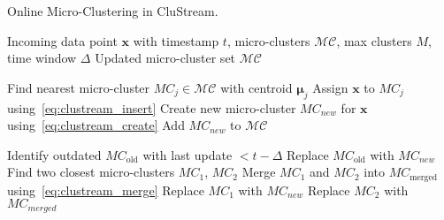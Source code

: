 \begin{algorithm}[H]
    \caption{Online Micro-Clustering in CluStream.}
    \label{alg:clustream_online}
    \begin{algorithmic}[1]
        \REQUIRE Incoming data point $\mathbf{x}$ with timestamp $t$, micro-clusters $\mathcal{MC}$, max clusters $M$, time window $\Delta$
        \ENSURE Updated micro-cluster set $\mathcal{MC}$

        \STATE Find nearest micro-cluster $MC_j \in \mathcal{MC}$ with centroid $\boldsymbol{\mu}_j$
        \STATE Assign $\mathbf{x}$ to $MC_j$ using~\ref{eq:clustream_insert}
        \ELSE
        \STATE Create new micro-cluster $MC_{new}$ for $\mathbf{x}$ using~\ref{eq:clustream_create}
        \STATE Add $MC_{new}$ to $\mathcal{MC}$
        
        \ELSE
        \STATE Identify outdated $MC_{\text{old}}$ with last update $< t - \Delta$
        \STATE Replace $MC_{\text{old}}$ with $MC_{new}$
        \ELSE
        \STATE Find two closest micro-clusters $MC_1$, $MC_2$
        \STATE Merge $MC_1$ and $MC_2$ into $MC_{\text{merged}}$ using~\ref{eq:clustream_merge}
        \STATE Replace $MC_1$ with $MC_{new}$
        \STATE Replace $MC_2$ with $MC_{merged}$
        \ENDIF
        \ENDIF
        \ENDIF
    \end{algorithmic}
\end{algorithm}
